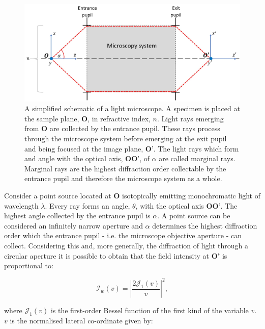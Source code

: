 \begin{figure}[h]
	\centering
	\includegraphics[width=\textwidth]{images/simplified_microscope_layout.jpg}
	\caption[A simplified schematic of a light microscope.]{A simplified 
		schematic of a light microscope. A specimen 
		is placed at the sample plane, $\textbf{O}$, in refractive index, $n$. Light 
		rays emerging from $\textbf{O}$ are collected by the entrance pupil. These 
		rays process through the microscope system before emerging at the exit pupil 
		and being focused at the image plane, $\textbf{O'}$. The light rays which 
		form and angle with the optical axis, $\textbf{OO'}$, of $\alpha$ are called
		marginal rays. Marginal rays are the highest diffraction order collectable by
		the entrance pupil and therefore the microscope system as a whole.}
	\label{fig:simplified_microscope_layout}
\end{figure}

Consider a point source located at $\textbf{O}$ isotopically emitting 
monochromatic light of wavelength $\lambda$. Every ray forms an angle, 
$\theta$, with the optical axis $\textbf{OO'}$. The highest angle collected
by the entrance pupil is $\alpha$. A point source can be considered an 
infinitely narrow aperture and $\alpha$ determines the highest 
diffraction order which the entrance pupil - i.e. the microscope
objective aperture - can collect\cite{davidson2002optical}. Considering this 
and, more generally, the diffraction of light through a circular aperture 
it is possible to obtain that the field intensity at \textbf{O'} is 
proportional to\cite{goodman2005introduction,born2013principles}:

\begin{equation}\label{eq:image_field_insentity}
\mathcal{I}_{w}(v) = \left|\frac{2\mathcal{J}_{1}(v)}{v}\right|^2,
\end{equation}

where $\mathcal{J}_{1}(v)$ is the first-order Bessel function of the first 
kind of the variable $v$\cite{watson1995treatise}. $v$ is the normalised 
lateral co-ordinate given by\cite{wilson1984theory}:

